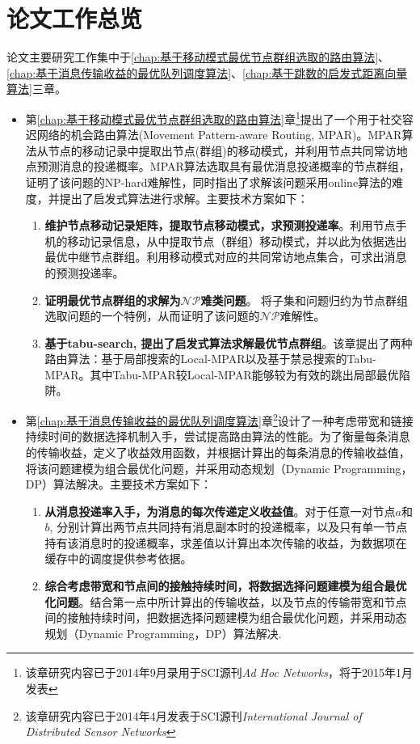 \chapter{论文工作总览}

论文主要研究工作集中于\ref{chap:基于移动模式最优节点群组选取的路由算法}、\ref{chap:基于消息传输收益的最优队列调度算法}、\ref{chap:基于跳数的启发式距离向量算法}三章。

\begin{itemize}
\item 第\ref{chap:基于移动模式最优节点群组选取的路由算法}章\footnote{该章研究内容已于2014年9月录用于SCI源刊\textit{Ad Hoc Networks}，将于2015年1月发表}提出了一个用于社交容迟网络的机会路由算法(Movement Pattern-aware Routing, MPAR)。MPAR算法从节点的移动记录中提取出节点(群组)的移动模式，并利用节点共同常访地点预测消息的投递概率。MPAR算法选取具有最优消息投递概率的节点群组，证明了该问题的NP-hard难解性，同时指出了求解该问题采用online算法的难度，并提出了启发式算法进行求解。主要技术方案如下：
\begin{enumerate}
\item \textbf{维护节点移动记录矩阵，提取节点移动模式，求预测投递率}。利用节点手机的移动记录信息，从中提取节点（群组）移动模式，并以此为依据选出最优中继节点群组。利用移动模式对应的共同常访地点集合，可求出消息的预测投递率。

\item \textbf{证明最优节点群组的求解为$\mathcal{NP}$难类问题}。
将子集和问题归约为节点群组选取问题的一个特例，从而证明了该问题的$\mathcal{NP}$难解性。

\item \textbf{基于tabu-search, 提出了启发式算法求解最优节点群组}。该章提出了两种路由算法：基于局部搜索的Local-MPAR以及基于禁忌搜索的Tabu-MPAR。其中Tabu-MPAR较Local-MPAR能够较为有效的跳出局部最优陷阱。
\end{enumerate}


\item 第\ref{chap:基于消息传输收益的最优队列调度算法}章\footnote{该章研究内容已于2014年4月发表于SCI源刊\textit{International Journal of Distributed Sensor Networks}}设计了一种考虑带宽和链接持续时间的数据选择机制入手，尝试提高路由算法的性能。为了衡量每条消息的传输收益，定义了收益效用函数，并根据计算出的每条消息的传输收益值，将该问题建模为组合最优化问题，并采用动态规划（Dynamic Programming，DP）算法解决。主要技术方案如下：
\begin{enumerate}
\item \textbf{从消息投递率入手，为消息的每次传递定义收益值}。对于任意一对节点$a$和$b$, 分别计算出两节点共同持有消息副本时的投递概率，以及只有单一节点持有该消息时的投递概率，求差值以计算出本次传输的收益，为数据项在缓存中的调度提供参考依据。
\item \textbf{综合考虑带宽和节点间的接触持续时间，将数据选择问题建模为组合最优化问题}。结合第一点中所计算出的传输收益，以及节点的传输带宽和节点间的接触持续时间，把数据选择问题建模为组合最优化问题，并采用动态规划（Dynamic Programming，DP）算法解决.
\end{enumerate}


\end{itemize}
